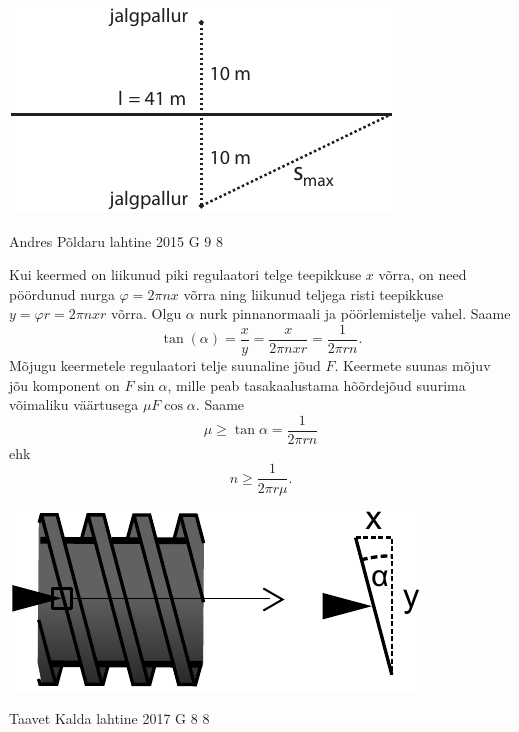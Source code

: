\documentclass[11pt]{article}
\begin{document}
{{\begin{center}
\includegraphics{2013-v3g-09-jalgpallurid}
\end{center}
\fi
}

{Andres Põldaru} %
{lahtine} %
{2015} %
{G 9} %
{8} %
{

\ifSolution
Kui keermed on liikunud piki regulaatori telge teepikkuse $x$ võrra, on need pöördunud nurga $\varphi=2\pi nx$ võrra ning liikunud teljega risti teepikkuse $y=\varphi r=2\pi nxr$ võrra. Olgu $\alpha$ nurk pinnanormaali ja pöörlemistelje vahel. Saame 
\[
\tan(\alpha)=\frac{x}{y}=\frac{x}{2\pi nxr}=\frac{1}{2\pi rn}.
\]
Mõjugu keermetele regulaatori telje suunaline jõud $F$. Keermete suunas mõjuv jõu komponent on $F\sin\alpha$, mille peab tasakaalustama hõõrdejõud suurima võimaliku väärtusega $\mu F\cos\alpha$. Saame 
\[
\mu\geq\tan\alpha=\frac{1}{2\pi rn}
\]
ehk
\[
n\ge\frac{1}{2\pi r\mu}.
\]

\begin{center}
\includegraphics[width=0.5\linewidth]{2015-lahg-09-mutriv6ti_lahendus.pdf}
\end{center}
\fi
}

{Taavet Kalda} %
{lahtine} %
{2017} %
{G 8} %
{8} %
{

}}
\end{document}
